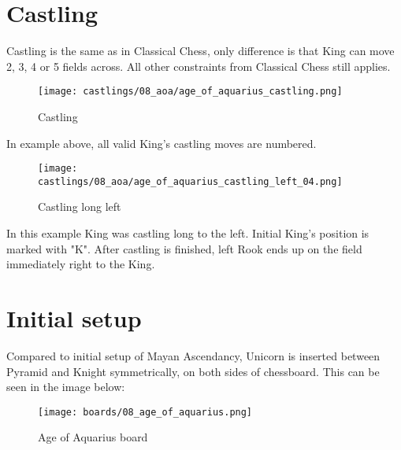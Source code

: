 \section*{Castling}

Castling is the same as in Classical Chess, only difference is that King can move 2, 3, 4 or 5 fields across.
All other constraints from Classical Chess still applies.

\noindent
\begin{figure}[!h]
\texttt{[image: castlings/08\_aoa/age\_of\_aquarius\_castling.png]}
\caption{Castling}
\label{fig:age_of_aquarius_castling}
\end{figure}

In example above, all valid King's castling moves are numbered.

\noindent
\begin{figure}[!h]
\texttt{[image: castlings/08\_aoa/age\_of\_aquarius\_castling\_left\_04.png]}
\caption{Castling long left}
\label{fig:age_of_aquarius_castling_left_04}
\end{figure}

In this example King was castling long to the left. Initial King's position is marked with "K".
After castling is finished, left Rook ends up on the field immediately right to the King.

\clearpage %

\section*{Initial setup}

Compared to initial setup of Mayan Ascendancy, Unicorn is inserted between Pyramid and Knight
symmetrically, on both sides of chessboard. This can be seen in the image below:

\noindent
\begin{figure}[h]
\texttt{[image: boards/08\_age\_of\_aquarius.png]}
\caption{Age of Aquarius board}
\label{fig:08_age_of_aquarius}
\end{figure}

\clearpage %
